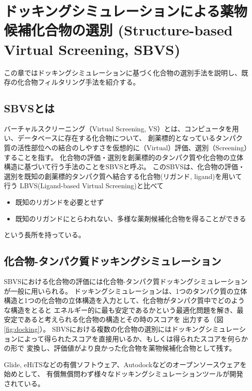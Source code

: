 \chapter{ドッキングシミュレーションによる薬物候補化合物の選別 (Structure-based Virtual Screening, SBVS)}
この章ではドッキングシミュレーションに基づく化合物の選別手法を説明し、既存の化合物フィルタリング手法を紹介する。

\section{SBVSとは}
バーチャルスクリーニング（Virtual Screening, VS）とは、コンピュータを用い、データベースに存在する化合物について、
創薬標的となっているタンパク質の活性部位への結合のしやすさを仮想的に（Virtual）評価、選別（Screening）することを指す。
化合物の評価・選別を創薬標的のタンパク質や化合物の立体構造に基づいて行う手法のことをSBVSと呼ぶ。
このSBVSは、化合物の評価・選別を既知の創薬標的タンパク質へ結合する化合物(リガンド, ligand)を用いて行う
LBVS(Ligand-based Virtual Screening)と比べて
\begin{itemize}
\item 既知のリガンドを必要とせず
\item 既知のリガンドにとらわれない、多様な薬剤候補化合物を得ることができる
\end{itemize}
という長所を持っている。

\section{化合物-タンパク質ドッキングシミュレーション}
SBVSにおける化合物の評価には化合物-タンパク質ドッキングシミュレーションが一般に用いられる。
ドッキングシミュレーションは、1つのタンパク質の立体構造と1つの化合物の立体構造を入力として、化合物がタンパク質中でどのような構造をとると
エネルギー的に最も安定であるかという最適化問題を解き、最安定であると考えられる化合物の構造とその時のスコアを
出力する（図\ref{fig:docking}）。
SBVSにおける複数の化合物の選別にはドッキングシミュレーションによって得られたスコアを直接用いるか、もしくは得られたスコアを何らかの形で
変換し、評価値がより良かった化合物を薬物候補化合物として残す。

Glide\citetodo{}, eHiTS\citetodo{}などの有償ソフトウェア、Autodock\citetodo{}などのオープンソースウェアを始めとして、
有償無償問わず様々なドッキングシミュレーションツールが開発されている。

